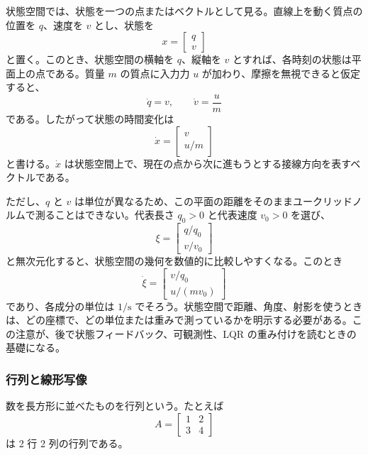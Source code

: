 状態空間では、状態を一つの点またはベクトルとして見る。直線上を動く質点の位置を $q$、速度を $v$ とし、状態を
\begin{equation}
  x=\begin{bmatrix}q\\v\end{bmatrix}
\end{equation}
と置く。このとき、状態空間の横軸を $q$、縦軸を $v$ とすれば、各時刻の状態は平面上の点である。質量 $m$ の質点に入力力 $u$ が加わり、摩擦を無視できると仮定すると、
\begin{equation}
  \dot{q}=v,
  \qquad
  \dot{v}=\frac{u}{m}
\end{equation}
である。したがって状態の時間変化は
\begin{equation}
  \dot{x}
  =
  \begin{bmatrix}
    v\\
    u/m
  \end{bmatrix}
\end{equation}
と書ける。$\dot{x}$ は状態空間上で、現在の点から次に進もうとする接線方向を表すベクトルである。

ただし、$q$ と $v$ は単位が異なるため、この平面の距離をそのままユークリッドノルムで測ることはできない。代表長さ $q_0>0$ と代表速度 $v_0>0$ を選び、
\begin{equation}
  \xi=
  \begin{bmatrix}
    q/q_0\\
    v/v_0
  \end{bmatrix}
\end{equation}
と無次元化すると、状態空間の幾何を数値的に比較しやすくなる。このとき
\begin{equation}
  \dot{\xi}
  =
  \begin{bmatrix}
    v/q_0\\
    u/(m v_0)
  \end{bmatrix}
\end{equation}
であり、各成分の単位は $1/\mathrm{s}$ でそろう。状態空間で距離、角度、射影を使うときは、どの座標で、どの単位または重みで測っているかを明示する必要がある。この注意が、後で状態フィードバック、可観測性、LQR の重み付けを読むときの基礎になる。

\subsubsection{行列と線形写像}

\begin{definition}[行列]
数を長方形に並べたものを行列という。たとえば
\begin{equation}
  A=\begin{bmatrix}1&2\\3&4\end{bmatrix}
\end{equation}
は 2 行 2 列の行列である。
\end{definition}

